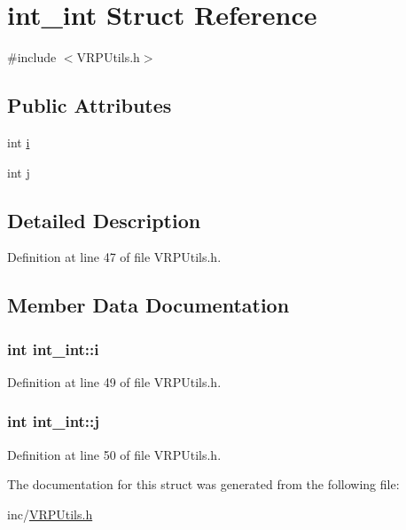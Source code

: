 \hypertarget{structint__int}{
\section{int\_\-int Struct Reference}
\label{structint__int}
}


{\ttfamily \#include $<$VRPUtils.h$>$}

\subsection*{Public Attributes}
\begin{DoxyCompactItemize}
\item 
int \hyperlink{structint__int_ab87b589c81836a7fdcbd26fd2df4c05b}{i}
\item 
int \hyperlink{structint__int_ad1b45000d7cd28256e60ca1c720a8bfb}{j}
\end{DoxyCompactItemize}


\subsection{Detailed Description}


Definition at line 47 of file VRPUtils.h.



\subsection{Member Data Documentation}
\hypertarget{structint__int_ab87b589c81836a7fdcbd26fd2df4c05b}{
\subsubsection[{i}]{\setlength{\rightskip}{0pt plus 5cm}int {\bf int\_\-int::i}}}
\label{structint__int_ab87b589c81836a7fdcbd26fd2df4c05b}


Definition at line 49 of file VRPUtils.h.

\hypertarget{structint__int_ad1b45000d7cd28256e60ca1c720a8bfb}{
\subsubsection[{j}]{\setlength{\rightskip}{0pt plus 5cm}int {\bf int\_\-int::j}}}
\label{structint__int_ad1b45000d7cd28256e60ca1c720a8bfb}


Definition at line 50 of file VRPUtils.h.



The documentation for this struct was generated from the following file:\begin{DoxyCompactItemize}
\item 
inc/\hyperlink{_v_r_p_utils_8h}{VRPUtils.h}\end{DoxyCompactItemize}
